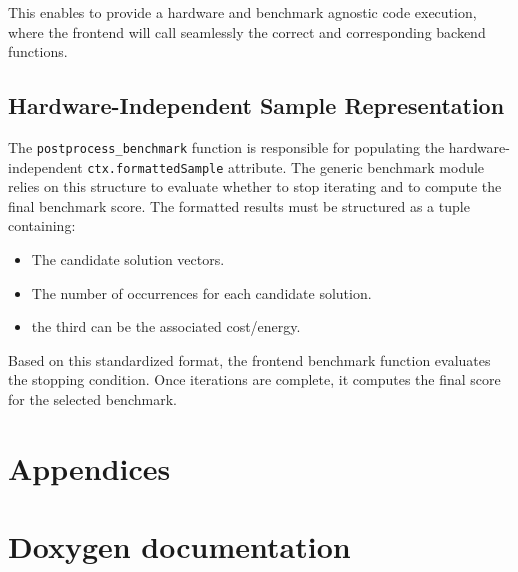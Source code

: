 This enables to provide a hardware and benchmark agnostic code execution, where the frontend will call seamlessly the correct and corresponding backend functions.

\subsection{Hardware-Independent Sample Representation}

The \texttt{postprocess\_benchmark} function is responsible for populating the hardware-independent \texttt{ctx.formattedSample} attribute. The generic benchmark module relies on this structure to evaluate whether to stop iterating and to compute the final benchmark score.
The formatted results must be structured as a tuple containing:
\begin{itemize}
	\item The candidate solution vectors.
	\item The number of occurrences for each candidate solution.
	\item the third can be the associated cost/energy.
\end{itemize}
Based on this standardized format, the frontend benchmark function evaluates the stopping condition. Once iterations are complete, it computes the final score for the selected benchmark.

\section*{Appendices}
\setcounter{section}{0}
\renewcommand{\thesection}{\thechapter.\Alph{section}}



\section{Doxygen documentation}

